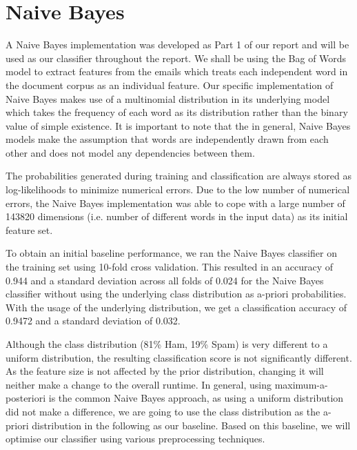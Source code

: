 \section{Naive Bayes}
A Naive Bayes implementation was developed as Part 1 of our report and will be used as our classifier throughout the report.
We shall be using the Bag of Words model to extract features from the emails which treats each independent word in the document corpus as an individual feature.
Our specific implementation of Naive Bayes makes use of a multinomial distribution in its underlying model which takes the frequency of each word as its distribution rather than the binary value of simple existence.
It is important to note that the in general, Naive Bayes models make the assumption that words are independently drawn from each other and does not model any dependencies between them.

The probabilities generated during training and classification are always stored as log-likelihoods to minimize numerical errors.
Due to the low number of numerical errors, the Naive Bayes implementation was able to cope with a large number of 143820 dimensions (i.e. number of different words in the input data) as its initial feature set.

To obtain an initial baseline performance, we ran the Naive Bayes classifier on the training set using 10-fold cross validation.
This resulted in an accuracy of 0.944 and a standard deviation across all folds of 0.024 for the Naive Bayes classifier without using the underlying class distribution as a-priori probabilities.
With the usage of the underlying distribution, we get a classification accuracy of 0.9472 and a standard deviation of 0.032.

Although the class distribution (81\% Ham, 19\% Spam) is very different to a uniform distribution, the resulting classification score is not significantly different.
As the feature size is not affected by the prior distribution, changing it will neither make a change to the overall runtime.
In general, using maximum-a-posteriori is the common Naive Bayes approach, as using a uniform distribution did not make a difference, we are going to use the class distribution as the a-priori distribution in the following as our baseline.
Based on this baseline, we will optimise our classifier using various preprocessing techniques.

